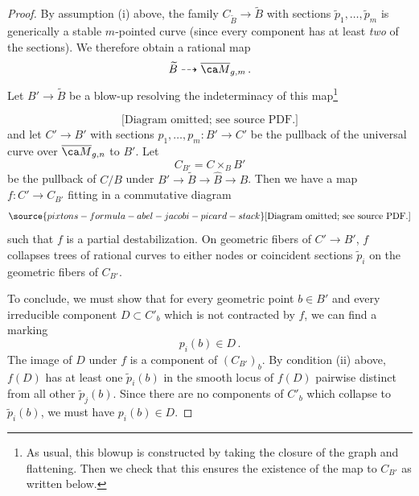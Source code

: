 \begin{proof}
By assumption (i) above, the family $C_{\widetilde B} \to \widetilde B$ with sections $\widetilde p_1, \ldots, \widetilde p_m$ is generically a stable $m$-pointed curve (since
every component has at least \emph{two} of the sections). We therefore obtain
a rational map $$\widetilde B \dashrightarrow \Mbar_{g,m}\, .$$
Let $B' \to \widetilde B$ be a blow-up resolving the indeterminacy of this map\footnote{As usual, this blowup is constructed by taking the closure of the graph and flattening. Then we check that this ensures the existence of the map to $C_{B'}$ as written below.}

\begin{equation}
\text{[Diagram omitted; see source PDF.]}
\end{equation}
 and let $C' \to B'$ with sections $p_1, \ldots, p_m : B' \to C'$
 be the pullback of the universal curve over $\Mbar_{g,n}$ to $B'$. Let
 $$C_{B'} = C \times_B B'$$
 be the pullback of $C/B$ under $B' \to \widetilde B \to \widehat B \to B$. Then we have a map $f: C' \to C_{B'}$ fitting in a commutative diagram
 \begin{equation} \label{eqn:partstabilizationalteration}
\source{pixtons-formula-abel-jacobi-picard-stack}
 \text{[Diagram omitted; see source PDF.]}
 \end{equation}
 such that $f$ is a partial destabilization. On geometric fibers of $C'\to B'$,
 $f$ collapses trees of rational curves to either nodes or coincident
  sections $\widetilde p_i$ on
 the geometric fibers of $C_{B'}$.

 To conclude, we must show that for every geometric point $b \in B'$ and every irreducible component $D \subset C'_b$ which is not contracted by $f$, we can
 find a marking
 $$p_i(b)\in D \, .$$
 The image of $D$ under $f$ is a component of $(C_{B'})_b$.
 By condition (ii) above, $f(D)$
 has at least one $\widetilde p_i(b)$ in the smooth locus of $f(D)$
 pairwise distinct from all other $\widetilde p_j(b)$.
 Since there are no components of $C'_b$ which collapse to $\widetilde p_i(b)$, we
 must have $p_i(b) \in D$.
 \end{proof}



